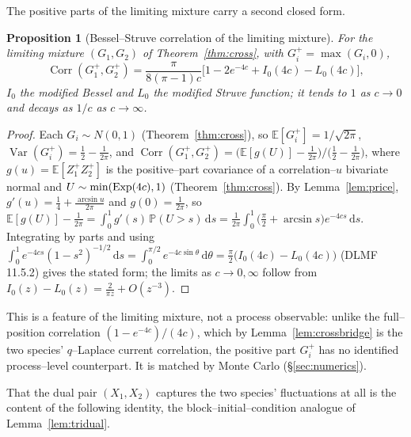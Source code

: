 \documentclass[11pt]{article}
\theoremstyle{plain}
\newtheorem{proposition}[theorem]{Proposition}
\theoremstyle{definition}
\theoremstyle{remark}
\DeclareMathOperator{\Var}{Var}\DeclareMathOperator{\Cov}{Cov}
\DeclareMathOperator{\Corr}{Corr}\DeclareMathOperator{\cum}{cum}
\newcommand{\E}{\mathbb{E}}\newcommand{\PP}{\mathbb{P}}\newcommand{\dd}{\,\mathrm{d}}
\begin{document}
The positive parts of the limiting mixture carry a second closed form.

\begin{proposition}[Bessel--Struve correlation of the limiting mixture]\label{prop:struve}
For the limiting mixture $(G_1,G_2)$ of Theorem~\ref{thm:cross}, with $G_i^+=\max(G_i,0)$,
\[
  \Corr(G_1^+,G_2^+)=\frac{\pi}{8(\pi-1)c}\big[1-2e^{-4c}+I_0(4c)-L_0(4c)\big],
\]
$I_0$ the modified Bessel and $L_0$ the modified Struve function; it tends to $1$ as
$c\to0$ and decays as $1/c$ as $c\to\infty$.
\end{proposition}
\begin{proof}
Each $G_i\sim N(0,1)$ (Theorem~\ref{thm:cross}), so $\E[G_i^+]=1/\sqrt{2\pi}$,
$\Var(G_i^+)=\tfrac12-\tfrac1{2\pi}$, and
$\Corr(G_1^+,G_2^+)=\big(\E[g(U)]-\tfrac1{2\pi}\big)\big/\big(\tfrac12-\tfrac1{2\pi}\big)$,
where $g(u)=\E[Z_1^+Z_2^+]$ is the positive--part covariance of a correlation--$u$
bivariate normal and $U\sim\min(\mathrm{Exp}(4c),1)$ (Theorem~\ref{thm:cross}). By
Lemma~\ref{lem:price}, $g'(u)=\tfrac14+\tfrac{\arcsin u}{2\pi}$ and $g(0)=\tfrac1{2\pi}$,
so $\E[g(U)]-\tfrac1{2\pi}=\int_0^1 g'(s)\,\PP(U>s)\dd s
=\tfrac1{2\pi}\int_0^1\big(\tfrac\pi2+\arcsin s\big)e^{-4cs}\dd s$. Integrating by parts and
using $\int_0^1 e^{-4cs}(1-s^2)^{-1/2}\dd s=\int_0^{\pi/2}e^{-4c\sin\theta}\dd\theta
=\tfrac\pi2\big(I_0(4c)-L_0(4c)\big)$ (DLMF 11.5.2) gives the stated form; the limits as
$c\to0,\infty$ follow from $I_0(z)-L_0(z)=\tfrac2{\pi z}+O(z^{-3})$.
\end{proof}

This is a feature of the limiting mixture, not a process observable: unlike the
full--position correlation $(1-e^{-4c})/(4c)$, which by Lemma~\ref{lem:crossbridge} is the
two species' $q$--Laplace current correlation, the positive part $G_i^+$ has no
identified process--level counterpart. It is matched by Monte Carlo (\S\ref{sec:numerics}).

That the dual pair $(X_1,X_2)$ captures the two species' fluctuations at all is the
content of the following identity, the block--initial--condition analogue of
Lemma~\ref{lem:tridual}.
\end{document}
